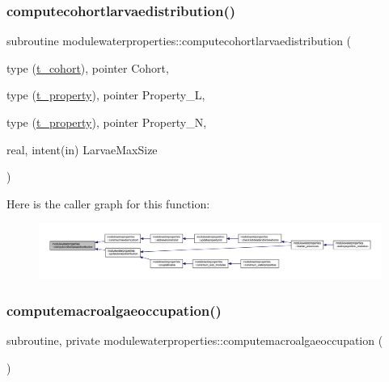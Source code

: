 \subsubsection{\texorpdfstring{computecohortlarvaedistribution()}{computecohortlarvaedistribution()}}
{\footnotesize\ttfamily subroutine modulewaterproperties\+::computecohortlarvaedistribution (\begin{DoxyParamCaption}\item[{type (\mbox{\hyperlink{structmodulewaterproperties_1_1t__cohort}{t\+\_\+cohort}}), pointer}]{Cohort,  }\item[{type (\mbox{\hyperlink{structmodulewaterproperties_1_1t__property}{t\+\_\+property}}), pointer}]{Property\+\_\+L,  }\item[{type (\mbox{\hyperlink{structmodulewaterproperties_1_1t__property}{t\+\_\+property}}), pointer}]{Property\+\_\+N,  }\item[{real, intent(in)}]{Larvae\+Max\+Size }\end{DoxyParamCaption})\hspace{0.3cm}{\ttfamily [private]}}

Here is the caller graph for this function\+:\nopagebreak
\begin{figure}[H]
\begin{center}
\leavevmode
\includegraphics[width=350pt]{namespacemodulewaterproperties_a21e9506395b0784b11cea81e68719de8_icgraph}
\end{center}
\end{figure}
\mbox{\label{namespacemodulewaterproperties_a196db184712b743908b747b05495bc60}} 
\subsubsection{\texorpdfstring{computemacroalgaeoccupation()}{computemacroalgaeoccupation()}}
{\footnotesize\ttfamily subroutine, private modulewaterproperties\+::computemacroalgaeoccupation (\begin{DoxyParamCaption}{ }\end{DoxyParamCaption})\hspace{0.3cm}{\ttfamily [private]}}

